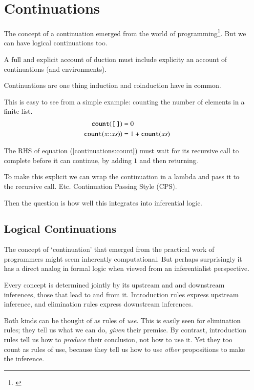 \chapter{Continuations}

The concept of a \gls{continuation} emerged from the world of
programming\footnote{\cite{discovery_continuations}}. But we can have
logical continuations too.

A full and explicit account of duction must include explicity an
account of continuations (and environments).

Continuations are one thing induction and coinduction have in common.

This is easy to see from a simple example: counting the number of
elements in a finite list.
\begin{align}
  \texttt{count}(\texttt{[\,]}) &= 0 \\ \texttt{count}(x{\mathpunct{::}}xs)) &= 1
  + \texttt{count}(xs) \label{continuations:count}
\end{align}

The RHS of equation (\ref{continuations:count}) must wait for its
recursive call to complete before it can continue, by adding \(1\) and
then returning.

To make this explicit we can wrap the continuation in a lambda and
pass it to the recursive call. Etc. Continuation Passing Style (CPS).

Then the question is how well this integrates into inferential logic.

\section{Logical Continuations}

The concept of `continuation' that emerged from the practical work of
programmers might seem inherently computational. But perhaps
surprisingly it has a direct analog in formal logic when viewed from
an inferentialist perspective.

Every concept is determined jointly by its upstream and and downstream
inferences, those that lead to and from it. Introduction rules express
upstream inference, and elimination rules express downstream
inferences.

Both kinds can be thought of as rules of \textit{use}. This is easily
seen for elimination rules; they tell us what we can do,
\textit{given} their premise. By contrast, introduction rules tell us
how to \textit{produce} their conclusion, not how to use it. Yet they
too count as rules of use, because they tell us how to use
\textit{other} propositions to make the inference.

